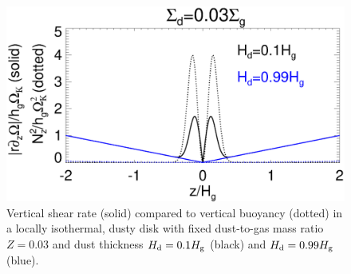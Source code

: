 \begin{figure}
  \includegraphics[width=\linewidth]{figures/compare_vshear_Nz2_fixZ} 
  \caption{Vertical shear rate (solid) compared to vertical buoyancy (dotted) in a locally isothermal, dusty disk
    with fixed dust-to-gas mass ratio $Z=0.03$ and dust thickness $H_\mathrm{d}=0.1H_\mathrm{g}$
    (black) and $H_\mathrm{d}=0.99H_\mathrm{g}$ (blue). 
    \label{compare_vshear_fixZ}
    }
\end{figure}



